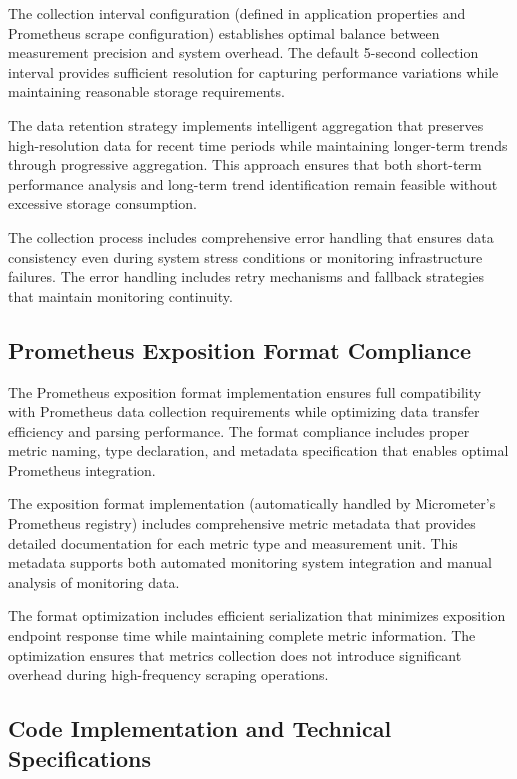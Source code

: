 The collection interval configuration (defined in application properties and Prometheus scrape configuration) establishes optimal balance between measurement precision and system overhead. The default 5-second collection interval provides sufficient resolution for capturing performance variations while maintaining reasonable storage requirements.

The data retention strategy implements intelligent aggregation that preserves high-resolution data for recent time periods while maintaining longer-term trends through progressive aggregation. This approach ensures that both short-term performance analysis and long-term trend identification remain feasible without excessive storage consumption.

The collection process includes comprehensive error handling that ensures data consistency even during system stress conditions or monitoring infrastructure failures. The error handling includes retry mechanisms and fallback strategies that maintain monitoring continuity.

\subsection{Prometheus Exposition Format Compliance}

The Prometheus exposition format implementation ensures full compatibility with Prometheus data collection requirements while optimizing data transfer efficiency and parsing performance. The format compliance includes proper metric naming, type declaration, and metadata specification that enables optimal Prometheus integration.

The exposition format implementation (automatically handled by Micrometer's Prometheus registry) includes comprehensive metric metadata that provides detailed documentation for each metric type and measurement unit. This metadata supports both automated monitoring system integration and manual analysis of monitoring data.

The format optimization includes efficient serialization that minimizes exposition endpoint response time while maintaining complete metric information. The optimization ensures that metrics collection does not introduce significant overhead during high-frequency scraping operations.

\subsection{Code Implementation and Technical Specifications}

